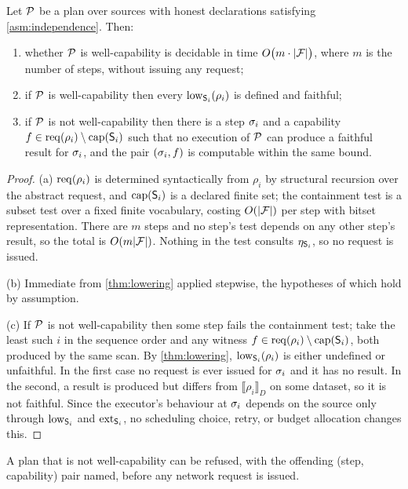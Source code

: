 \begin{theorem}
\label{thm:static}
Let $\mathcal{P}$ be a plan over sources with honest declarations satisfying
\cref{asm:independence}. Then:
\begin{enumerate}[label=(\alph*),leftmargin=2.4em]
\item whether $\mathcal{P}$ is well-capability is decidable in time
$O\bigl(m \cdot |\mathcal{F}|\bigr)$, where $m$ is the number of steps, without
issuing any request;
\item if $\mathcal{P}$ is well-capability then every $\mathrm{low}_{\mathsf{S}_i}(\rho_i)$ is
defined and faithful;
\item if $\mathcal{P}$ is not well-capability then there is a step $\sigma_i$ and a
capability $f \in \mathrm{req}(\rho_i) \setminus \mathrm{cap}(\mathsf{S}_i)$ such that no execution
of $\mathcal{P}$ can produce a faithful result for $\sigma_i$, and the pair
$(\sigma_i, f)$ is computable within the same bound.
\end{enumerate}
\end{theorem}

\begin{proof}
(a) $\mathrm{req}(\rho_i)$ is determined syntactically from $\rho_i$ by structural
recursion over the abstract request, and $\mathrm{cap}(\mathsf{S}_i)$ is a declared finite
set; the containment test is a subset test over a fixed finite vocabulary,
costing $O(|\mathcal{F}|)$ per step with bitset representation. There are $m$ steps
and no step's test depends on any other step's result, so the total is
$O(m|\mathcal{F}|)$. Nothing in the test consults $\eta_{\mathsf{S}_i}$, so no request is
issued.

(b) Immediate from \cref{thm:lowering} applied stepwise, the hypotheses of
which hold by assumption.

(c) If $\mathcal{P}$ is not well-capability then some step fails the containment
test; take the least such $i$ in the sequence order and any witness
$f \in \mathrm{req}(\rho_i)\setminus\mathrm{cap}(\mathsf{S}_i)$, both produced by the same scan. By
\cref{thm:lowering}, $\mathrm{low}_{\mathsf{S}_i}(\rho_i)$ is either undefined or unfaithful.
In the first case no request is ever issued for $\sigma_i$ and it has no result.
In the second, a result is produced but differs from
$\llbracket \rho_i \rrbracket_D$ on some dataset, so it is not faithful. Since
the executor's behaviour at $\sigma_i$ depends on the source only through
$\mathrm{low}_{\mathsf{S}_i}$ and $\mathrm{ext}_{\mathsf{S}_i}$, no scheduling choice, retry, or budget
allocation changes this.
\end{proof}

\begin{corollary}
\label{cor:refuse-before-contact}
A plan that is not well-capability can be refused, with the offending
(step, capability) pair named, before any network request is issued.
\end{corollary}

